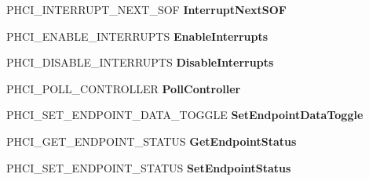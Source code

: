 \begin{DoxyCompactItemize}
\item 
\mbox{\label{struct___u_s_b_p_o_r_t___r_e_g_i_s_t_r_a_t_i_o_n___p_a_c_k_e_t_a4c4bb3c92a3e4565564c72f5f8849436}} 
P\+H\+C\+I\+\_\+\+I\+N\+T\+E\+R\+R\+U\+P\+T\+\_\+\+N\+E\+X\+T\+\_\+\+S\+OF {\bfseries Interrupt\+Next\+S\+OF}
\item 
\mbox{\label{struct___u_s_b_p_o_r_t___r_e_g_i_s_t_r_a_t_i_o_n___p_a_c_k_e_t_a1ab36be0d5dd8d429bac4625f33234ca}} 
P\+H\+C\+I\+\_\+\+E\+N\+A\+B\+L\+E\+\_\+\+I\+N\+T\+E\+R\+R\+U\+P\+TS {\bfseries Enable\+Interrupts}
\item 
\mbox{\label{struct___u_s_b_p_o_r_t___r_e_g_i_s_t_r_a_t_i_o_n___p_a_c_k_e_t_a45694f7835e280326c38e9439935363b}} 
P\+H\+C\+I\+\_\+\+D\+I\+S\+A\+B\+L\+E\+\_\+\+I\+N\+T\+E\+R\+R\+U\+P\+TS {\bfseries Disable\+Interrupts}
\item 
\mbox{\label{struct___u_s_b_p_o_r_t___r_e_g_i_s_t_r_a_t_i_o_n___p_a_c_k_e_t_a95c781da426538cab35c229ef4b09db6}} 
P\+H\+C\+I\+\_\+\+P\+O\+L\+L\+\_\+\+C\+O\+N\+T\+R\+O\+L\+L\+ER {\bfseries Poll\+Controller}
\item 
\mbox{\label{struct___u_s_b_p_o_r_t___r_e_g_i_s_t_r_a_t_i_o_n___p_a_c_k_e_t_a955d1e8495a35559dae3f1b46b4bf4b8}} 
P\+H\+C\+I\+\_\+\+S\+E\+T\+\_\+\+E\+N\+D\+P\+O\+I\+N\+T\+\_\+\+D\+A\+T\+A\+\_\+\+T\+O\+G\+G\+LE {\bfseries Set\+Endpoint\+Data\+Toggle}
\item 
\mbox{\label{struct___u_s_b_p_o_r_t___r_e_g_i_s_t_r_a_t_i_o_n___p_a_c_k_e_t_a1e357d535cdaf35a0708ba8a410ff3ac}} 
P\+H\+C\+I\+\_\+\+G\+E\+T\+\_\+\+E\+N\+D\+P\+O\+I\+N\+T\+\_\+\+S\+T\+A\+T\+US {\bfseries Get\+Endpoint\+Status}
\item 
\mbox{\label{struct___u_s_b_p_o_r_t___r_e_g_i_s_t_r_a_t_i_o_n___p_a_c_k_e_t_a14977c06fc6eba53974386f408396eb0}} 
P\+H\+C\+I\+\_\+\+S\+E\+T\+\_\+\+E\+N\+D\+P\+O\+I\+N\+T\+\_\+\+S\+T\+A\+T\+US {\bfseries Set\+Endpoint\+Status}

\end{DoxyCompactItemize}
